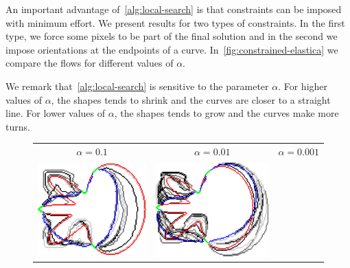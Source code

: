 An important advantage of~\cref{alg:local-search} is that constraints can be imposed with minimum effort. We present results for two types of constraints. In the first type, we force some pixels to be part of the final solution and in the second we impose orientations at the endpoints of a curve. In~\cref{fig:constrained-elastica} we compare the flows for different values of $\alpha$.

We remark that~\cref{alg:local-search} is sensitive to the parameter $\alpha$. For higher values of $\alpha$, the shapes tends to shrink and the curves are closer to a straight line. For lower values of $\alpha$, the shapes tends to grow and the curves make more turns. 

\begin{figure}
\center
\begin{tabular}{ccc}
$\alpha=0.1$ & $\alpha=0.01$ & $\alpha=0.001$\\[2em]
\includegraphics[scale=0.25]{figures/chapter5/fixed-pixels/elastica/len_pen_0.1/flower-1/summary.pdf} &
\includegraphics[scale=0.25]{figures/chapter5/fixed-pixels/elastica/len_pen_0.01/flower-1/summary.pdf} &

\end{tabular}
\end{figure}
